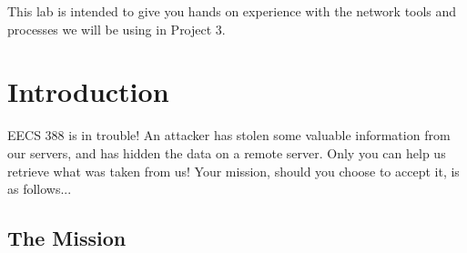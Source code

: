 \documentclass[letterpaper,12pt]{article}
\newcommand{\htitle}
{
     \noindent\parbox{\textwidth}
    {
        \course\hfill \distdate\newline
        \coursename\hfill 
        \settitle \vspace*{-.5ex}\newline
        \mbox{}\hrulefill\mbox{}
    }
    \vspace{8pt}
    \begin{center}{\Large\bf{\settitle}}\end{center}
}
\newcommand{\handout}
{
    \thispagestyle{empty}
    \markboth{}{}
    \pagestyle{plain}
    \htitle
}
\newcommand{\problemsetheader}
{
\setlength{\parindent}{0pt}

This lab is intended to give you hands on experience with the network tools and processes we will be using in Project 3.

\medskip
}
\begin{document}
\handout
\problemsetheader

\vspace*{-15pt}
\section*{Introduction}

EECS 388 is in trouble! An attacker has stolen some valuable information from our servers, and has hidden the data on a remote server. Only you can help us retrieve what was taken from us! Your mission, should you choose to accept it, is as follows...


\vspace{-6pt}
\subsection*{The Mission}
\end{document}
